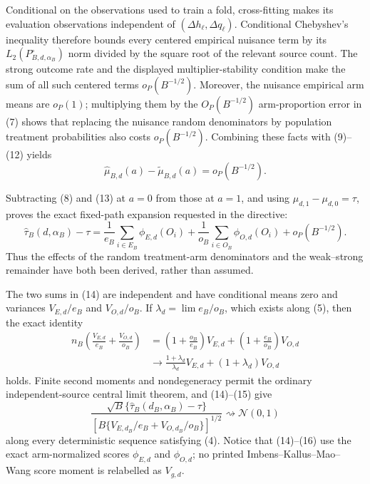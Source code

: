 Conditional on the observations used to train a fold, cross-fitting makes its evaluation observations independent of \((\Delta h_\ell,\Delta q_\ell)\).  Conditional Chebyshev's inequality therefore bounds every centered empirical nuisance term by its \(L_2(P_{B,d,\alpha_B}^{\circ})\) norm divided by the square root of the relevant source count.  The strong outcome rate and the displayed multiplier-stability condition make the sum of all such centered terms \(o_P(B^{-1/2})\).  Moreover, the nuisance empirical arm means are \(o_P(1)\); multiplying them by the \(O_P(B^{-1/2})\) arm-proportion error in (7) shows that replacing the nuisance random denominators by population treatment probabilities also costs \(o_P(B^{-1/2})\).  Combining these facts with (9)--(12) yields
\[
 \widehat\mu_{B,d}(a)-\widetilde\mu_{B,d}(a)=o_P(B^{-1/2}). \tag{13}
\]

Subtracting (8) and (13) at \(a=0\) from those at \(a=1\), and using \(\mu_{d,1}-\mu_{d,0}=\tau\), proves the exact fixed-path expansion requested in the directive:
\[
 \widehat\tau_B(d,\alpha_B)-\tau
 =\frac1{e_B}\sum_{i\in E_B}\phi_{E,d}(O_i)
  +\frac1{o_B}\sum_{i\in O_B}\phi_{O,d}(O_i)
  +o_P(B^{-1/2}).                                           \tag{14}
\]
Thus the effects of the random treatment-arm denominators and the weak--strong remainder have both been derived, rather than assumed.

The two sums in (14) are independent and have conditional means zero and variances \(V_{E,d}/e_B\) and \(V_{O,d}/o_B\).  If
\(\lambda_d=\lim e_B/o_B\), which exists along (5), then the exact identity
\[
\begin{aligned}
 n_B\left(\frac{V_{E,d}}{e_B}+\frac{V_{O,d}}{o_B}\right)
 &=\left(1+\frac{o_B}{e_B}\right)V_{E,d}
  +\left(1+\frac{e_B}{o_B}\right)V_{O,d}\\
 &\longrightarrow
 \frac{1+\lambda_d}{\lambda_d}V_{E,d}
 +(1+\lambda_d)V_{O,d}
\end{aligned}                                                \tag{15}
\]
holds.  Finite second moments and nondegeneracy permit the ordinary independent-source central limit theorem, and (14)--(15) give
\[
 \frac{\sqrt B\{\widehat\tau_B(d_B,\alpha_B)-\tau\}}
 {\left[B\{V_{E,d_B}/e_B+V_{O,d_B}/o_B\}\right]^{1/2}}
 \rightsquigarrow\mathcal N(0,1)                           \tag{16}
\]
along every deterministic sequence satisfying (4).  Notice that (14)--(16) use the exact arm-normalized scores \(\phi_{E,d}\) and \(\phi_{O,d}\); no printed Imbens--Kallus--Mao--Wang score moment is relabelled as \(V_{g,d}\).

